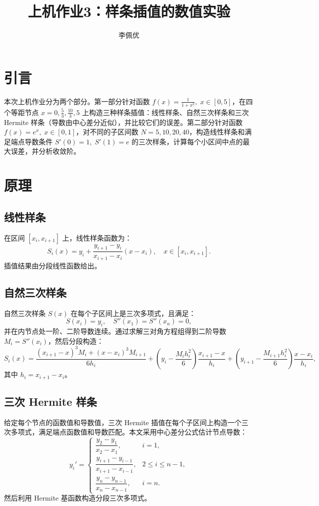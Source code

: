 \documentclass{article}
\title{上机作业3：样条插值的数值实验}
\author{李佩优}
\begin{document}
\maketitle

\section{引言}
本次上机作业分为两个部分。第一部分针对函数 \(f(x)=\frac{1}{1+x^2},\;x\in[0,5]\)，在四个等距节点 \(x=0,\frac{5}{3},\frac{10}{3},5\) 上构造三种样条插值：线性样条、自然三次样条和三次 Hermite 样条（导数由中心差分近似），并比较它们的误差。第二部分针对函数 \(f(x)=e^x,\;x\in[0,1]\)，对不同的子区间数 \(N=5,10,20,40\)，构造线性样条和满足端点导数条件 \(S'(0)=1,\;S'(1)=e\) 的三次样条，计算每个小区间中点的最大误差，并分析收敛阶。

\section{原理}
\subsection{线性样条}
在区间 \([x_i,x_{i+1}]\) 上，线性样条函数为：
\[
S_i(x)=y_i+\frac{y_{i+1}-y_i}{x_{i+1}-x_i}(x-x_i),\quad x\in[x_i,x_{i+1}].
\]
插值结果由分段线性函数给出。

\subsection{自然三次样条}
自然三次样条 \(S(x)\) 在每个子区间上是三次多项式，且满足：
\[
S(x_i)=y_i,\quad S''(x_1)=S''(x_n)=0,
\]
并在内节点处一阶、二阶导数连续。通过求解三对角方程组得到二阶导数 \(M_i=S''(x_i)\)，然后分段构造：
\[
S_i(x)=\frac{(x_{i+1}-x)^3M_i+(x-x_i)^3M_{i+1}}{6h_i}
+\left(y_i-\frac{M_i h_i^2}{6}\right)\frac{x_{i+1}-x}{h_i}
+\left(y_{i+1}-\frac{M_{i+1} h_i^2}{6}\right)\frac{x-x_i}{h_i},
\]
其中 \(h_i=x_{i+1}-x_i\)。

\subsection{三次 Hermite 样条}
给定每个节点的函数值和导数值，三次 Hermite 插值在每个子区间上构造一个三次多项式，满足端点函数值和导数匹配。本文采用中心差分公式估计节点导数：
\[
y_i'=\begin{cases}
\dfrac{y_2-y_1}{x_2-x_1}, & i=1,\\[8pt]
\dfrac{y_{i+1}-y_{i-1}}{x_{i+1}-x_{i-1}}, & 2\le i\le n-1,\\[8pt]
\dfrac{y_n-y_{n-1}}{x_n-x_{n-1}}, & i=n.
\end{cases}
\]
然后利用 Hermite 基函数构造分段三次多项式。
\end{document}
